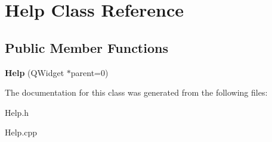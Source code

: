 \hypertarget{class_help}{\section{\-Help \-Class \-Reference}
\label{class_help}
}
\subsection*{\-Public \-Member \-Functions}
\begin{DoxyCompactItemize}
\item 
\hypertarget{class_help_a7359f816eb2dab34e4c7017e36c9654d}{{\bfseries \-Help} (\-Q\-Widget $\ast$parent=0)}\label{class_help_a7359f816eb2dab34e4c7017e36c9654d}

\end{DoxyCompactItemize}


\-The documentation for this class was generated from the following files\-:\begin{DoxyCompactItemize}
\item 
\-Help.\-h\item 
\-Help.\-cpp\end{DoxyCompactItemize}
